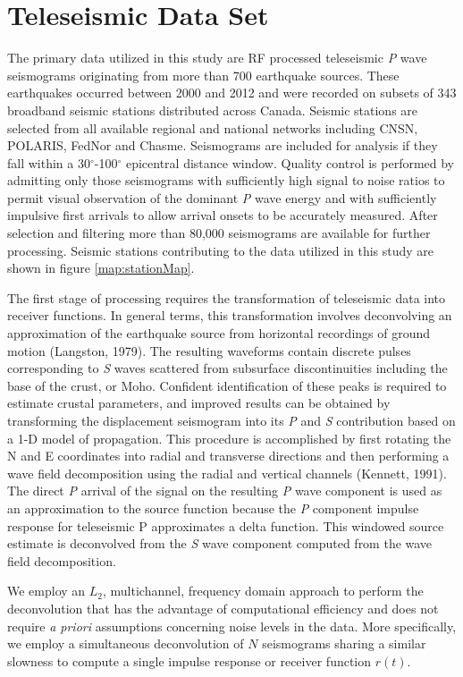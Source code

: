 \documentclass[msc,oneside]{ubcthesis}
\begin{document}
\section{Teleseismic Data Set} \label{section:seismicdata}
The primary data utilized in this study are RF processed teleseismic {\it P} wave seismograms originating from more than 700 earthquake sources. These earthquakes occurred between 2000 and 2012 and were recorded on subsets of 343 broadband seismic stations distributed across Canada. Seismic stations are selected from all available regional and national networks including CNSN, POLARIS, FedNor and Chasme. Seismograms are included for analysis if they fall within a 30$^\circ$-100$^\circ$ epicentral distance window. Quality control is performed by admitting only those seismograms with sufficiently high signal to noise ratios to permit visual observation of the dominant {\it P} wave energy and with sufficiently impulsive first arrivals to allow arrival onsets to be accurately measured. After selection and filtering more than 80,000 seismograms are available for further processing. Seismic stations contributing to the data utilized in this study are shown in figure \ref{map:stationMap}.

The first stage of processing requires the transformation of teleseismic data into receiver functions. In general terms, this transformation involves deconvolving an approximation of the earthquake source from horizontal recordings of ground motion (Langston, 1979). The resulting waveforms contain discrete pulses corresponding to {\it S} waves scattered from subsurface discontinuities including the base of the crust, or Moho. Confident identification of these peaks is required to estimate crustal parameters, and improved results can be obtained by transforming the displacement seismogram into its {\it P} and {\it S} contribution based on a 1-D model of propagation. This procedure is accomplished by first rotating the N and E coordinates into radial and transverse directions and then performing a wave field decomposition using the radial and vertical channels (Kennett, 1991). The direct {\it P} arrival of the signal on the resulting {\it P} wave component is used as an approximation to the source function because the {\it P} component impulse response for teleseismic P approximates a delta function. This windowed source estimate is deconvolved from the {\it S} wave component computed from the wave field decomposition.

We employ an $L_2$, multichannel, frequency domain approach to perform the deconvolution that has the advantage of computational efficiency and does not require {\it a priori} assumptions concerning noise levels in the data. More specifically, we employ a simultaneous deconvolution of $N$ seismograms sharing a similar slowness to compute a single impulse response or receiver function $r(t)$.
\end{document}
